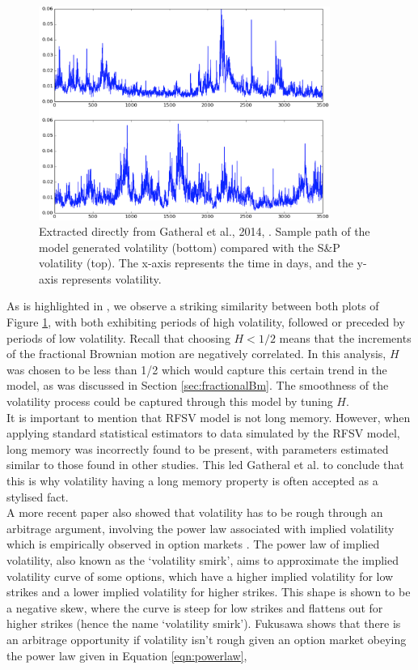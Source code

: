 \documentclass[12pt,oneside]{article}
\begin{document}
\begin{figure}[htpb]
    \centering
    \includegraphics[width=0.85\textwidth ]{figs/Gatheral2014_fig36_p22}
    \caption{Extracted directly from Gatheral et al., 2014, \cite[Figure~3.6]{Gatheral2014}. Sample path of the model generated volatility (bottom) compared with the S\&P volatility (top). The x-axis represents the time in days, and the y-axis represents volatility.}
    \label{fig:gatheral_2014_volplots}
\end{figure}

As is highlighted in \cite{Gatheral2014}, we observe a striking similarity between both plots of Figure \ref{fig:gatheral_2014_volplots}, with both exhibiting periods of high volatility, followed or preceded by periods of low volatility. Recall that choosing $H<1/2$ means that the increments of the fractional Brownian motion are negatively correlated. In this analysis, $H$ was chosen to be less than 1/2 which would capture this certain trend in the model, as was discussed in Section \ref{sec:fractionalBm}. The smoothness of the volatility process could be captured through this model by tuning $H$.
\\

It is important to mention that RFSV model is not long memory. However, when applying standard statistical estimators to data simulated by the RFSV model, long memory was incorrectly found to be present, with parameters estimated similar to those found in other studies. This led Gatheral et al. to conclude that this is why volatility having a long memory property is often accepted as a stylised fact. 
\\

A more recent paper \cite{Fukasawa2020} also showed that volatility has to be rough through an arbitrage argument, involving the power law associated with implied volatility which is empirically observed in option markets \cite{Carr2001}. The power law of implied volatility, also known as the `volatility smirk', aims to approximate the implied volatility curve of some options, which have a higher implied volatility for low strikes and a lower implied volatility for higher strikes. This shape is shown to be a negative skew, where the curve is steep for low strikes and flattens out for higher strikes (hence the name `volatility smirk'). Fukusawa \cite{Fukasawa2020} shows that there is an arbitrage opportunity if volatility isn't rough given an option market obeying the power law given in Equation \ref{eqn:powerlaw},
\end{document}
